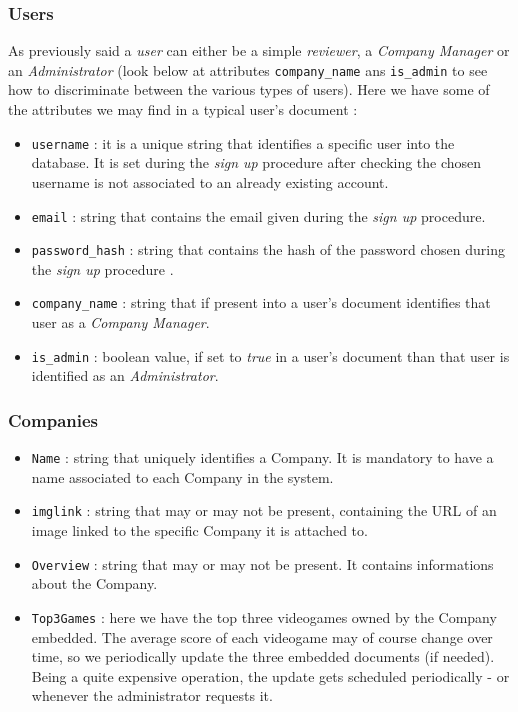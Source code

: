 \subsubsection{Users}
As previously said a \emph{user} can either be a simple \emph{reviewer}, a \emph{Company Manager} or an \emph{Administrator} (look below at attributes \texttt{company\_name} ans \texttt{is\_admin} to see how to discriminate between the various types of users). 
Here we have some of the attributes we may find in a typical user's document :
\begin{itemize}
    \item \texttt{username} : it is a unique string that identifies a specific user into the database. It is set during the \emph{sign up} procedure after checking the chosen username is not associated to an already existing account.
    \item \texttt{email} : string that contains the email given during the \emph{sign up} procedure.
    \item \texttt{password\_hash} : string that contains the hash of the password chosen during the \emph{sign up} procedure .
    \item \texttt{company\_name} : string that if present into a user's document identifies that user as a \emph{Company Manager}.
    \item \texttt{is\_admin} : boolean value, if set to \emph{true} in a user's document than that user is identified as an \emph{Administrator}.
\end{itemize}
\subsubsection{Companies}
\begin{itemize}
    \item \texttt{Name} : string that uniquely identifies a Company. It is mandatory to have a name associated to each Company in the system. 
    \item \texttt{imglink} : string that may or may not be present, containing the URL of an image linked to the specific Company it is attached to.
    \item \texttt{Overview} : string that may or may not be present. It contains informations about the Company.
    \item \texttt{Top3Games} : here we have the top three videogames owned by the Company embedded. The average score of each videogame may of course change over time, so we periodically update the three embedded documents (if needed). Being a quite expensive operation, the update gets scheduled periodically - or whenever the administrator requests it. 
\end{itemize}
